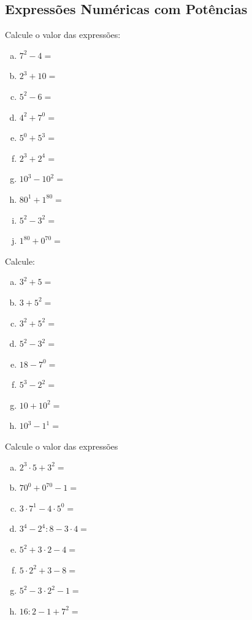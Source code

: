 \subsection{Expressões Numéricas com Potências}

\item Calcule o valor das expressões:
\begin{multicols}{5}
\begin{enumerate}[a)]
	\item $7^2 - 4 =$
	\item $2^3 + 10 =$
	\item $5^2 - 6 =$
	\item $4^2 + 7^0=$
	\item $5^0+ 5^3=$
	\item $2^3+ 2^4 =$
	\item $10^3 - 10^2 =$
	\item $80^1 + 1^{80} =$
	\item $5^2 - 3^2 =$
	\item $1^{80} + 0^{70} =$
\end{enumerate}
\end{multicols}

\item Calcule:
\begin{multicols}{4}
\begin{enumerate}[a)]
	\item $3^2 + 5 =$
	\item $3 + 5^2 =$
	\item $3^2 + 5^2 =$
	\item $5^2 - 3^2 =$
	\item $18 - 7^0 =$
	\item $5^3 - 2^2 =$
	\item $10 + 10^2 =$
	\item $10^3 - 1^1 =$
\end{enumerate}
\end{multicols}

\item Calcule o valor das expressões
\begin{multicols}{3}
\begin{enumerate}[a)]
	\item $2^3 \cdot 5 + 3^2 =$
	\item $70^0+ 0^{70} - 1 =$
	\item $3 \cdot 7^1 - 4 \cdot 5^0 =$
	\item $3^4- 2^4: 8 - 3 \cdot 4 =$
	\item $5^2 + 3 \cdot 2 - 4 =$
	\item $5 \cdot 2^2 + 3 - 8 =$
	\item $5^2 - 3 \cdot 2^2 - 1 =$
	\item $16 : 2 - 1 + 7^2 =$
\end{enumerate}
\end{multicols}

